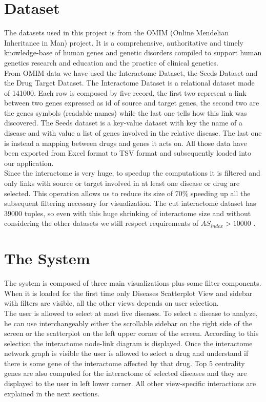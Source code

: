 \documentclass[12pt,twocolumn,twoside]{article}
\begin{document}
\section*{Dataset} %
The datasets used in this project is from the OMIM (Online Mendelian Inheritance in Man) project. It is a comprehensive, authoritative and timely knowledge-base of human genes and genetic disorders compiled to support human genetics research and education and the practice of clinical genetics. \\
From OMIM data we have used the Interactome Dataset, the Seeds Dataset and the Drug Target Dataset. The Interactome Dataset is a relational dataset made of 141000. Each row is composed by five record, the first two represent a link between two genes expressed as id of source and target genes, the second two are the genes symbols (readable names) while the last one tells how this link was discovered. The Seeds dataset is a key-value dataset with key the name of a disease and with value a list of genes involved in the relative disease. The last one is instead a mapping between drugs and genes it acts on. All those data have been exported from Excel format to TSV format and subsequently loaded into our application.\\ Since the interactome is very huge, to speedup the computations it is filtered and only links with source or target involved in at least one disease or drug are selected. This operation allows us to reduce its size of 70\% speeding up all the subsequent filtering necessary for visualization. The cut interactome dataset has $39000$ tuples, so even with this huge shrinking of interactome size and without considering the other datasets  we still respect requirements of $AS_{index} > 10000$ .

\section*{The System}
The system is composed of three main visualizations plus some filter components. When it is loaded for the first time only Diseases Scatterplot View and sidebar with filters are visible, all the other views depends on user selection.\\ 
The user is allowed to select at most five diseases. To select a disease to analyze, he can use interchangeably either the scrollable sidebar on the right side of the screen or the scatterplot on the left upper corner of the screen. According to this selection the interactome node-link diagram is displayed. Once the interactome network graph is visible the user is allowed to select a drug and understand if there is some gene of the interactome affected by that drug. Top 5 centrality genes are also computed for the interactome of selected diseases and they are displayed to the user in left lower corner. All other view-specific interactions are explained in the next sections.
\end{document}
